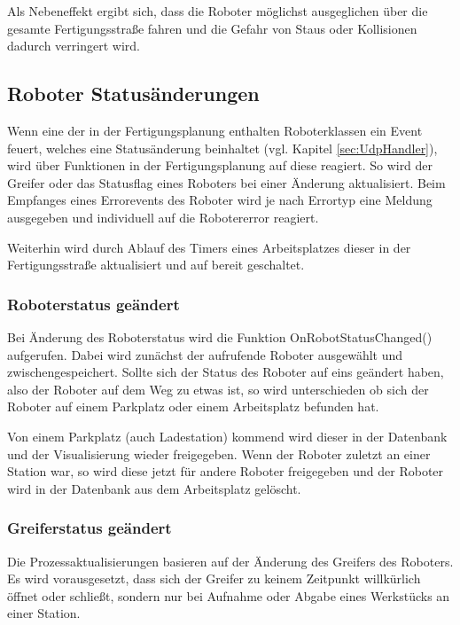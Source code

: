 Als Nebeneffekt ergibt sich, dass die Roboter möglichst ausgeglichen über die gesamte Fertigungsstraße fahren und die Gefahr von Staus oder Kollisionen dadurch verringert wird. 

\subsection{Roboter Statusänderungen}

Wenn eine der in der Fertigungsplanung enthalten Roboterklassen ein Event feuert, welches eine Statusänderung beinhaltet (vgl. Kapitel \ref{sec:UdpHandler}), wird über Funktionen in der Fertigungsplanung auf diese reagiert. So wird der Greifer oder das Statusflag eines Roboters bei einer Änderung aktualisiert. Beim Empfanges eines Errorevents des Roboter wird je nach Errortyp eine Meldung ausgegeben und individuell auf die Robotererror reagiert. 

Weiterhin wird durch Ablauf des Timers eines Arbeitsplatzes dieser in der Fertigungsstraße aktualisiert und auf bereit geschaltet. 


\subsubsection{Roboterstatus geändert}

Bei Änderung des Roboterstatus wird die Funktion OnRobotStatusChanged() aufgerufen. Dabei wird zunächst der aufrufende Roboter ausgewählt und zwischengespeichert. Sollte sich der Status des Roboter auf eins geändert haben, also der Roboter auf dem Weg zu etwas ist, so wird unterschieden ob sich der Roboter auf einem Parkplatz oder einem Arbeitsplatz befunden hat.

Von einem Parkplatz (auch Ladestation) kommend wird dieser in der Datenbank und der Visualisierung wieder freigegeben. Wenn der Roboter zuletzt an einer Station war, so wird diese jetzt für andere Roboter freigegeben und der Roboter wird in der Datenbank aus dem Arbeitsplatz gelöscht. 

\subsubsection{Greiferstatus geändert}

Die Prozessaktualisierungen basieren auf der Änderung des Greifers des Roboters. Es wird vorausgesetzt, dass sich der Greifer zu keinem Zeitpunkt willkürlich öffnet oder schließt, sondern nur bei Aufnahme oder Abgabe eines Werkstücks an einer Station. 

